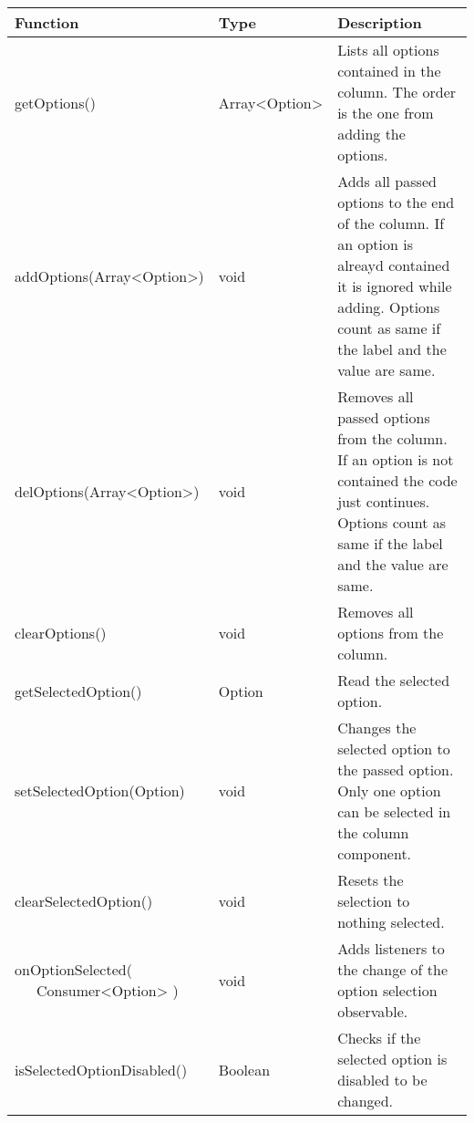 \begin{table}[!htb] 
    \label{api:columnOptionsComponentReturn}
    \footnotesize
    \setlength\extrarowheight{4pt}
    \begin{tabular}{ p{5cm} p{3cm} p{5cm} }
        \toprule[1.2pt]
        \textbf{Function}                   & \textbf{Type}  & \textbf{Description} \\
        \midrule
        getOptions()                        & Array<Option>  & Lists all options contained in the column. 
                                                               The order is the one from adding the options. \\
        addOptions(Array<Option>)           & void           & Adds all passed options to the end of the column. 
                                                               If an option is alreayd contained it is ignored while adding. 
                                                               Options count as same if the label and the value are same. \\
        delOptions(Array<Option>)           & void           & Removes all passed options from the column. 
                                                               If an option is not contained the code just continues. 
                                                               Options count as same if the label and the value are same. \\
        clearOptions()                      & void           & Removes all options from the column. \\
        getSelectedOption()                 & Option         & Read the selected option. \\
        setSelectedOption(Option)           & void           & Changes the selected option to the passed option. 
                                                               Only one option can be selected in the column component. \\
        clearSelectedOption()               & void           & Resets the selection to nothing selected. \\
        \tbbr{
            onOptionSelected( \\
                \ \ \ Consumer<Option>
            )}                              & void           & Adds listeners to the change of the option selection observable. \\
        isSelectedOptionDisabled()          & Boolean        & Checks if the selected option is disabled to be changed. \\

\end{tabular}
\end{table}
